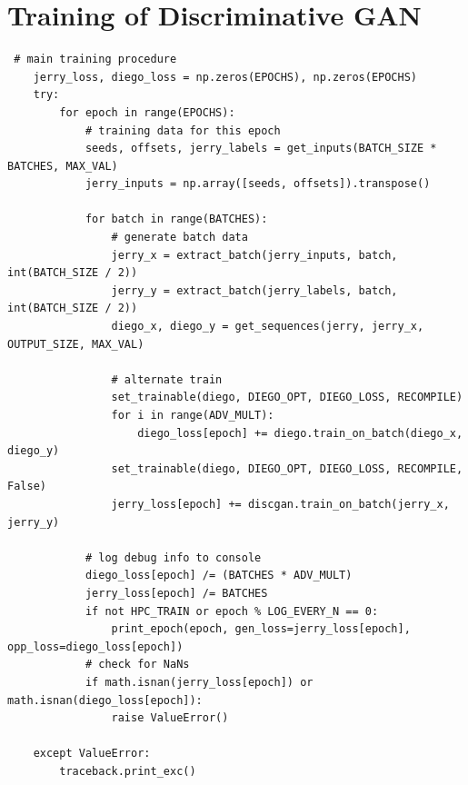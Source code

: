 \documentclass[12pt, titlepage]{report}
\theoremstyle{definition}
\begin{document}
\section{Training of Discriminative GAN}\label{appendix:training_discgan}
\begin{verbatim}
 # main training procedure
    jerry_loss, diego_loss = np.zeros(EPOCHS), np.zeros(EPOCHS)
    try:
        for epoch in range(EPOCHS):
            # training data for this epoch
            seeds, offsets, jerry_labels = get_inputs(BATCH_SIZE * BATCHES, MAX_VAL)
            jerry_inputs = np.array([seeds, offsets]).transpose()

            for batch in range(BATCHES):
                # generate batch data
                jerry_x = extract_batch(jerry_inputs, batch, int(BATCH_SIZE / 2))
                jerry_y = extract_batch(jerry_labels, batch, int(BATCH_SIZE / 2))
                diego_x, diego_y = get_sequences(jerry, jerry_x, OUTPUT_SIZE, MAX_VAL)

                # alternate train
                set_trainable(diego, DIEGO_OPT, DIEGO_LOSS, RECOMPILE)
                for i in range(ADV_MULT):
                    diego_loss[epoch] += diego.train_on_batch(diego_x, diego_y)
                set_trainable(diego, DIEGO_OPT, DIEGO_LOSS, RECOMPILE, False)
                jerry_loss[epoch] += discgan.train_on_batch(jerry_x, jerry_y)

            # log debug info to console
            diego_loss[epoch] /= (BATCHES * ADV_MULT)
            jerry_loss[epoch] /= BATCHES
            if not HPC_TRAIN or epoch % LOG_EVERY_N == 0:
                print_epoch(epoch, gen_loss=jerry_loss[epoch], opp_loss=diego_loss[epoch])
            # check for NaNs
            if math.isnan(jerry_loss[epoch]) or math.isnan(diego_loss[epoch]):
                raise ValueError()

    except ValueError:
        traceback.print_exc()
\end{verbatim}
\end{document}
